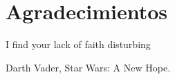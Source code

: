 %
%
%
%
%
%
%
%
%
%
%
%
%

\chapter{Agradecimientos}

\begin{FraseCelebre}
  \begin{Frase}
    I find your lack of faith disturbing\end{Frase}
  \begin{Fuente}
    Darth Vader, Star Wars: A New Hope.
  \end{Fuente}
\end{FraseCelebre}

